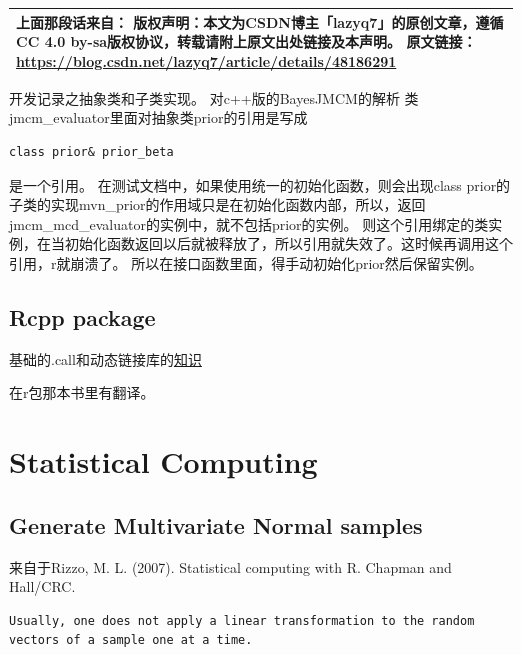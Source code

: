 \documentclass[
]{book}
\theoremstyle{definition}
\theoremstyle{definition}
\theoremstyle{definition}
\theoremstyle{remark}
\begin{document}
\begin{longtable}[]{@{}l@{}}
\toprule
\endhead
\begin{minipage}[t]{0.31\columnwidth}\raggedright
上面那段话来自：
版权声明：本文为CSDN博主「lazyq7」的原创文章，遵循CC 4.0 by-sa版权协议，转载请附上原文出处链接及本声明。
原文链接：\url{https://blog.csdn.net/lazyq7/article/details/48186291}\strut
\end{minipage}\tabularnewline
\bottomrule
\end{longtable}

开发记录之抽象类和子类实现。
对c++版的BayesJMCM的解析
类jmcm\_evaluator里面对抽象类prior的引用是写成

\begin{verbatim}
class prior& prior_beta
\end{verbatim}

是一个引用。
在测试文档中，如果使用统一的初始化函数，则会出现class prior的子类的实现mvn\_prior的作用域只是在初始化函数内部，所以，返回jmcm\_mcd\_evaluator的实例中，就不包括prior的实例。
则这个引用绑定的类实例，在当初始化函数返回以后就被释放了，所以引用就失效了。这时候再调用这个引用，r就崩溃了。
所以在接口函数里面，得手动初始化prior然后保留实例。

\hypertarget{rcpp-package}{%
\section{Rcpp package}\label{rcpp-package}}

基础的.call和动态链接库的\href{http://r-pkgs.had.co.nz/src.html}{知识}

在r包那本书里有翻译。

\hypertarget{statistical-computing}{%
\chapter{Statistical Computing}\label{statistical-computing}}

\hypertarget{generate-multivariate-normal-samples}{%
\section{Generate Multivariate Normal samples}\label{generate-multivariate-normal-samples}}

来自于Rizzo, M. L. (2007). Statistical computing with R. Chapman and Hall/CRC.

\begin{verbatim}
Usually, one does not apply a linear transformation to the random vectors of a sample one at a time.
\end{verbatim}
\end{document}
